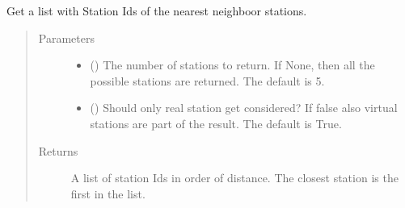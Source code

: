 \documentclass[letterpaper,10pt,english]{sphinxmanual}
\begin{document}
\begin{fulllineitems}
\begin{fulllineitems}
\begin{quote}
\begin{description}
\end{description}\end{quote}

\end{fulllineitems}


\begin{fulllineitems}
\label{\detokenize{weatherDB:weatherDB.station.StationBase.get_name}}
\end{fulllineitems}


\begin{fulllineitems}
\label{\detokenize{weatherDB:weatherDB.station.StationBase.get_neighboor_stids}}
\sphinxAtStartPar
Get a list with Station Ids of the nearest neighboor stations.
\begin{quote}\begin{description}
\item[{Parameters}] \leavevmode\begin{itemize}
\item {} 
\sphinxAtStartPar
{} (\sphinxstyleliteralemphasis{\sphinxupquote{, }}) \textendash{} The number of stations to return.
If None, then all the possible stations are returned.
The default is 5.

\item {} 
\sphinxAtStartPar
{} (\sphinxstyleliteralemphasis{\sphinxupquote{, }}) \textendash{} Should only real station get considered?
If false also virtual stations are part of the result.
The default is True.

\end{itemize}

\item[{Returns}] \leavevmode
\sphinxAtStartPar
A list of station Ids in order of distance.
The closest station is the first in the list.


\end{description}
\end{quote}
\end{fulllineitems}
\end{fulllineitems}
\end{document}
